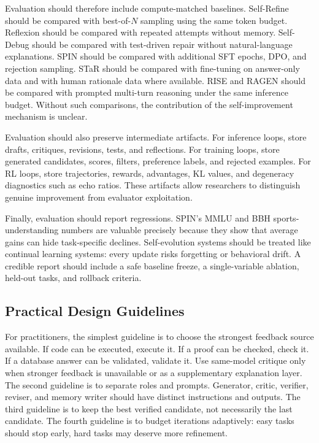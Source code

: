Evaluation should therefore include compute-matched baselines. Self-Refine should be compared with best-of-$N$ sampling using the same token budget. Reflexion should be compared with repeated attempts without memory. Self-Debug should be compared with test-driven repair without natural-language explanations. SPIN should be compared with additional SFT epochs, DPO, and rejection sampling. STaR should be compared with fine-tuning on answer-only data and with human rationale data where available. RISE and RAGEN should be compared with prompted multi-turn reasoning under the same inference budget. Without such comparisons, the contribution of the self-improvement mechanism is unclear.

Evaluation should also preserve intermediate artifacts. For inference loops, store drafts, critiques, revisions, tests, and reflections. For training loops, store generated candidates, scores, filters, preference labels, and rejected examples. For RL loops, store trajectories, rewards, advantages, KL values, and degeneracy diagnostics such as echo ratios. These artifacts allow researchers to distinguish genuine improvement from evaluator exploitation.

Finally, evaluation should report regressions. SPIN's MMLU and BBH sports-understanding numbers are valuable precisely because they show that average gains can hide task-specific declines. Self-evolution systems should be treated like continual learning systems: every update risks forgetting or behavioral drift. A credible report should include a safe baseline freeze, a single-variable ablation, held-out tasks, and rollback criteria.

\subsection{Practical Design Guidelines}
\label{subsec:practical-guidelines}

For practitioners, the simplest guideline is to choose the strongest feedback source available. If code can be executed, execute it. If a proof can be checked, check it. If a database answer can be validated, validate it. Use same-model critique only when stronger feedback is unavailable or as a supplementary explanation layer. The second guideline is to separate roles and prompts. Generator, critic, verifier, reviser, and memory writer should have distinct instructions and outputs. The third guideline is to keep the best verified candidate, not necessarily the last candidate. The fourth guideline is to budget iterations adaptively: easy tasks should stop early, hard tasks may deserve more refinement.

